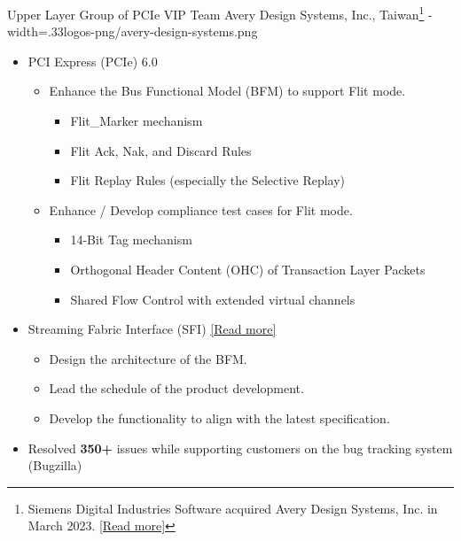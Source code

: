\documentclass{cvclass}
\newcommand{\simplemmyy}[3]{\shortmmyyformat\formatdate{#3}{#2}{#1}}
\begin{document}
    {Upper Layer Group of PCIe VIP Team}
    {Avery Design Systems, Inc., Taiwan\footnote{Siemens Digital Industries Software acquired Avery Design Systems, Inc. in March 2023. \href{https://newsroom.sw.siemens.com/en-US/siemens-avery-design-systems/}{[Read more]}}}
    {\simplemmyy{2021}{7}{19} - \simplemmyy{2023}{4}{10}}
    {width=.33\linewidth}{logos-png/avery-design-systems.png}
    {\begin{itemize}
        \item PCI Express\textsuperscript{\tiny\textregistered} (PCIe\textsuperscript{\tiny\textregistered}) 6.0
        \begin{itemize}
            \item Enhance the Bus Functional Model (BFM) to support Flit mode.
            \begin{itemize}
                \item Flit\_Marker mechanism
                \item Flit Ack, Nak, and Discard Rules
                \item Flit Replay Rules (especially the Selective Replay)
            \end{itemize}
            \item Enhance / Develop compliance test cases for Flit mode.
            \begin{itemize}
                \item 14-Bit Tag mechanism
                \item Orthogonal Header Content (OHC) of Transaction Layer Packets
                \item Shared Flow Control with extended virtual channels
            \end{itemize}
        \end{itemize}
        \item Streaming Fabric Interface (SFI) \href{https://cdrdv2.intel.com/v1/dl/getContent/644200}{[Read more]}
        \begin{itemize}
            \item Design the architecture of the BFM.
            \item Lead the schedule of the product development.
            \item Develop the functionality to align with the latest specification.
        \end{itemize}
        \item Resolved \textbf{350+} issues while supporting customers on the bug tracking system (Bugzilla)

\end{itemize}}
\end{document}
